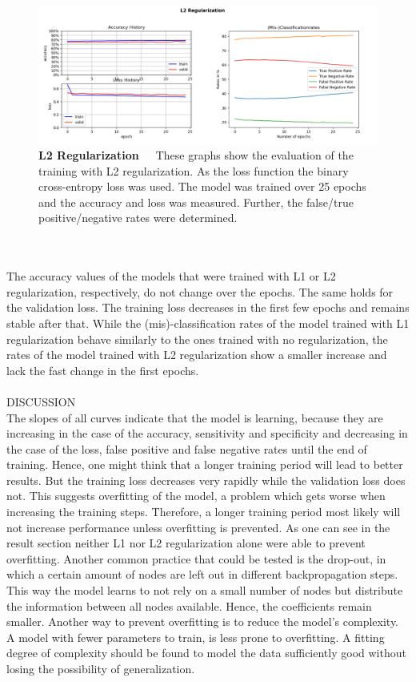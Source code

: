 \begin{figure}[h]
	\centering
	\includegraphics[scale=0.37]{Figures/chapter04/multilabel_L2}
	\decoRule
	\caption[L2 Regularization]{\textbf{L2 Regularization}~~~These graphs show the evaluation of the training with L2 regularization. As the loss function the binary cross-entropy loss was used. The model was trained over 25 epochs and the accuracy and loss was measured. Further, the false/true positive/negative rates were determined.}
	\label{fig:MultilabelL2Regularization}
\end{figure}
\\
\\
The accuracy values of the models that were trained with L1 or L2 regularization, respectively, do not change over the epochs. The same holds for the validation loss. The training loss decreases in the first few epochs and remains stable after that.
While the (mis)-classification rates of the model trained with L1 regularization behave similarly to the ones trained with no regularization, the rates of the model trained with L2 regularization show a smaller increase and lack the fast change in the first epochs. \\
\\
DISCUSSION \\
The slopes of all curves indicate that the model is learning, because they are increasing in the case of the accuracy, sensitivity and specificity and decreasing in the case of the loss, false positive and false negative rates until the end of training. Hence, one might think that a longer training period will lead to better results. But the training loss decreases very rapidly while the validation loss does not. This suggests overfitting of the model, a problem which gets worse when increasing the training steps. Therefore, a longer training period most likely will not increase performance unless overfitting is prevented. As one can see in the result section neither L1 nor L2 regularization alone were able to prevent overfitting. Another common practice that could be tested is the drop-out, in which a certain amount of nodes are left out in different backpropagation steps. This way the model learns to not rely on a small number of nodes but distribute the information between all nodes available. Hence, the coefficients remain smaller. Another way to prevent overfitting is to reduce the model's complexity. A model with fewer parameters to train, is less prone to overfitting. A fitting degree of complexity should be found to model the data sufficiently good without losing the possibility of generalization. \\
